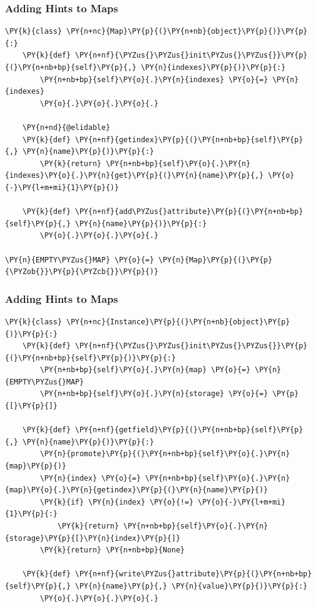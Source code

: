 \documentclass[utf8x]{beamer}
\begin{document}
\begin{frame}[containsverbatim]
\frametitle{Adding Hints to Maps}

\begin{Verbatim}[commandchars=\\\{\}]
\PY{k}{class} \PY{n+nc}{Map}\PY{p}{(}\PY{n+nb}{object}\PY{p}{)}\PY{p}{:}
    \PY{k}{def} \PY{n+nf}{\PYZus{}\PYZus{}init\PYZus{}\PYZus{}}\PY{p}{(}\PY{n+nb+bp}{self}\PY{p}{,} \PY{n}{indexes}\PY{p}{)}\PY{p}{:}
        \PY{n+nb+bp}{self}\PY{o}{.}\PY{n}{indexes} \PY{o}{=} \PY{n}{indexes}
        \PY{o}{.}\PY{o}{.}\PY{o}{.}

    \PY{n+nd}{@elidable}
    \PY{k}{def} \PY{n+nf}{getindex}\PY{p}{(}\PY{n+nb+bp}{self}\PY{p}{,} \PY{n}{name}\PY{p}{)}\PY{p}{:}
        \PY{k}{return} \PY{n+nb+bp}{self}\PY{o}{.}\PY{n}{indexes}\PY{o}{.}\PY{n}{get}\PY{p}{(}\PY{n}{name}\PY{p}{,} \PY{o}{-}\PY{l+m+mi}{1}\PY{p}{)}

    \PY{k}{def} \PY{n+nf}{add\PYZus{}attribute}\PY{p}{(}\PY{n+nb+bp}{self}\PY{p}{,} \PY{n}{name}\PY{p}{)}\PY{p}{:}
        \PY{o}{.}\PY{o}{.}\PY{o}{.}

\PY{n}{EMPTY\PYZus{}MAP} \PY{o}{=} \PY{n}{Map}\PY{p}{(}\PY{p}{\PYZob{}}\PY{p}{\PYZcb{}}\PY{p}{)}
\end{Verbatim}
\end{frame}

\begin{frame}[containsverbatim]
\frametitle{Adding Hints to Maps}

\begin{Verbatim}[commandchars=\\\{\}]
\PY{k}{class} \PY{n+nc}{Instance}\PY{p}{(}\PY{n+nb}{object}\PY{p}{)}\PY{p}{:}
    \PY{k}{def} \PY{n+nf}{\PYZus{}\PYZus{}init\PYZus{}\PYZus{}}\PY{p}{(}\PY{n+nb+bp}{self}\PY{p}{)}\PY{p}{:}
        \PY{n+nb+bp}{self}\PY{o}{.}\PY{n}{map} \PY{o}{=} \PY{n}{EMPTY\PYZus{}MAP}
        \PY{n+nb+bp}{self}\PY{o}{.}\PY{n}{storage} \PY{o}{=} \PY{p}{[}\PY{p}{]}

    \PY{k}{def} \PY{n+nf}{getfield}\PY{p}{(}\PY{n+nb+bp}{self}\PY{p}{,} \PY{n}{name}\PY{p}{)}\PY{p}{:}
        \PY{n}{promote}\PY{p}{(}\PY{n+nb+bp}{self}\PY{o}{.}\PY{n}{map}\PY{p}{)}
        \PY{n}{index} \PY{o}{=} \PY{n+nb+bp}{self}\PY{o}{.}\PY{n}{map}\PY{o}{.}\PY{n}{getindex}\PY{p}{(}\PY{n}{name}\PY{p}{)}
        \PY{k}{if} \PY{n}{index} \PY{o}{!=} \PY{o}{-}\PY{l+m+mi}{1}\PY{p}{:}
            \PY{k}{return} \PY{n+nb+bp}{self}\PY{o}{.}\PY{n}{storage}\PY{p}{[}\PY{n}{index}\PY{p}{]}
        \PY{k}{return} \PY{n+nb+bp}{None}

    \PY{k}{def} \PY{n+nf}{write\PYZus{}attribute}\PY{p}{(}\PY{n+nb+bp}{self}\PY{p}{,} \PY{n}{name}\PY{p}{,} \PY{n}{value}\PY{p}{)}\PY{p}{:}
        \PY{o}{.}\PY{o}{.}\PY{o}{.}
\end{Verbatim}
\end{frame}
\end{document}

